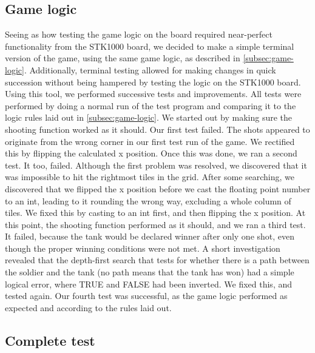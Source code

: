 \subsection{Game logic}
Seeing as how testing the game logic on the board required near-perfect
functionality from the STK1000 board, we decided to make a simple
terminal version of the game, using the same game logic, as described in
\ref{subsec:game-logic}. Additionally, terminal testing allowed for making 
changes in quick succession without being hampered by testing the logic on the STK1000 board.
Using this tool, we performed successive tests and improvements. All tests were performed by doing a normal run of the test program and comparing it to the logic rules laid out in \ref{subsec:game-logic}. We started out by making sure the shooting function worked as it should.
Our first test failed. The shots appeared to originate from the wrong corner in our first test run of the game. We rectified this by flipping the calculated x position. 
Once this was done, we ran a second test. It too, failed. Although the first problem was resolved, we discovered that it was impossible to hit the rightmost tiles in the grid. After some searching, we discovered that we flipped the x position before we cast the floating point number to an int, leading to it rounding the wrong way, excluding a whole column of tiles. We fixed this by casting to an int first, and then flipping the x position.
At this point, the shooting function performed as it should, and we ran a third test. It failed, because the tank would be declared winner after only one shot, even though the proper winning conditions were not met. A short investigation revealed that the depth-first search that tests for whether there is a path between the soldier and the tank (no path means that the tank has won) had a simple logical error, where TRUE and FALSE had been inverted. We fixed this, and tested again.
Our fourth test was successful, as the game logic performed as expected and according to the rules laid out.
\subsection{Complete test}
